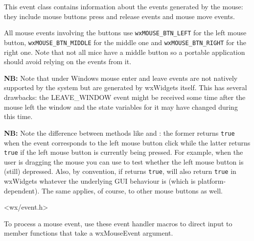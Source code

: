 \section{}\label{wxmouseevent}

This event class contains information about the events generated by the mouse:
they include mouse buttons press and release events and mouse move events.

All mouse events involving the buttons use {\tt wxMOUSE\_BTN\_LEFT} for the
left mouse button, {\tt wxMOUSE\_BTN\_MIDDLE} for the middle one and
{\tt wxMOUSE\_BTN\_RIGHT} for the right one. Note that not all mice have a
middle button so a portable application should avoid relying on the events from
it.

{\bf NB:} Note that under Windows mouse enter and leave events are not natively supported
by the system but are generated by wxWidgets itself. This has several
drawbacks: the LEAVE\_WINDOW event might be received some time after the mouse
left the window and the state variables for it may have changed during this
time.

{\bf NB:} Note the difference between methods like
 and
: the former returns {\tt true}
when the event corresponds to the left mouse button click while the latter
returns {\tt true} if the left mouse button is currently being pressed. For
example, when the user is dragging the mouse you can use
 to test
whether the left mouse button is (still) depressed. Also, by convention, if
 returns {\tt true},
 will also return {\tt true} in
wxWidgets whatever the underlying GUI behaviour is (which is
platform-dependent). The same applies, of course, to other mouse buttons as
well.




<wx/event.h>


To process a mouse event, use these event handler macros to direct input to member
functions that take a wxMouseEvent argument.

